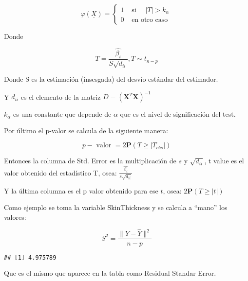 \documentclass[
]{article}
\newenvironment{Shaded}{\begin{snugshade}}{\end{snugshade}}
\newcommand{\AttributeTok}[1]{\textcolor[rgb]{0.77,0.63,0.00}{#1}}
\newcommand{\DecValTok}[1]{\textcolor[rgb]{0.00,0.00,0.81}{#1}}
\newcommand{\FunctionTok}[1]{\textcolor[rgb]{0.00,0.00,0.00}{#1}}
\newcommand{\NormalTok}[1]{#1}
\newcommand{\OtherTok}[1]{\textcolor[rgb]{0.56,0.35,0.01}{#1}}
\newcommand{\SpecialCharTok}[1]{\textcolor[rgb]{0.00,0.00,0.00}{#1}}
\newcommand{\StringTok}[1]{\textcolor[rgb]{0.31,0.60,0.02}{#1}}
\begin{document}
\[
\varphi(\underline{X})= \begin{cases}1 & \text { si } \quad|T|>k_{\alpha} \\ 0 & \text { en otro caso }\end{cases}
\]

Donde

\[
T=\frac{\hat{\beta_i}}{S \sqrt{d_{i i}}}, T ∼ t_{n - p}
\]

Donde S es la estimación (insesgada) del desvío estándar del estimador.

Y \(d_{ii}\) es el elemento de la matriz
\(D=\left(\mathbf{X}^{T} \mathbf{X}\right)^{-1}\)

\(k_{\alpha}\) es una constante que depende de \(\alpha\) que es el
nivel de significación del test.

Por último el p-valor se calcula de la siguiente manera:

\[
p-\text { valor }=2 \mathbf{P}\left(T \geq\left|T_{o b s}\right|\right)
\]

Entonces la columna de Std. Error es la multiplicación de \(s\) y
\(\sqrt{d_{ii}}\), t value es el valor obtenido del estadístico T, osea:
\(\frac{\hat{\beta_i}}{s \sqrt{d_{i i}}}\)

Y la última columna es el p valor obtenido para ese \(t\), osea:
\(2 \mathbf{P}\left(T \geq\left|t\right|\right)\)

Como ejemplo se toma la variable SkinThickness y se calcula a ``mano''
los valores:

\[S^{2}=\frac{\|Y-\hat{Y}\|^{2}}{n-p}\]

\begin{Shaded}
\end{Shaded}

\begin{verbatim}
## [1] 4.975789
\end{verbatim}

Que es el mismo que aparece en la tabla como Residual Standar Error.
\end{document}
